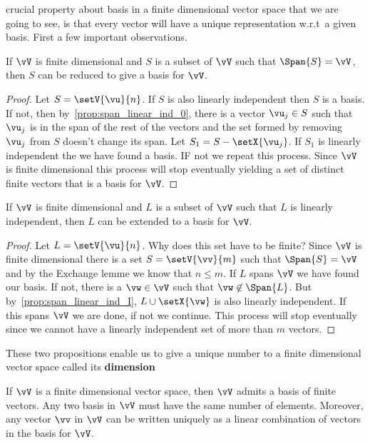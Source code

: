crucial property about basis in a finite dimensional vector space that we are going to see, is that every
vector will have a unique representation w.r.t~a given basis. 
First a few important observations.
\begin{Proposition}
    If $\vV$ is finite dimensional and $S$ is a subset of $\vV$ such that $\Span{S} = \vV$, then $S$ can be
    reduced to give a basis for $\vV$.
\end{Proposition}
\begin{proof}
    Let $S = \setV{\vu}{n}$. If $S$ is also linearly independent then $S$ is a basis. If not, then 
    by~\ref{prop:span_linear_ind_0}, there is a vector $\vu_j \in S$ such that $\vu_j$ is in the span of the
    rest of the vectors and the set formed by removing $\vu_j$ from $S$ doesn't change its span.  
    Let $S_1 = S - \setX{\vu_j}$. If $S_1$ is linearly independent the we have found a basis. IF not we repeat
    this process. Since $\vV$ is finite dimensional this process will stop eventually yielding a set of
    distinct finite vectors that is a basis for $\vV$.
\end{proof}
\begin{Proposition}
    If $\vV$ is finite dimensional and $L$ is a subset of $\vV$ such that $L$ is linearly independent, then
    $L$ can be extended to a basis for $\vV$.
\end{Proposition}
\begin{proof}
    Let $L = \setV{\vu}{n}$. Why does this set have to be finite? Since $\vV$ is finite dimensional there is a
    set $S = \setV{\vv}{m}$ such that $\Span{S} = \vV$ and by the Exchange lemme we know that $n \leq m$.
    If $L$ spans $\vV$ we have found our basis. If not, there is a $\vw \in \vV$ such that $\vw \not\in
    \Span{L}$. But by~\ref{prop:span_linear_ind_I}, $L\cup\setX{\vw}$ is also linearly independent. If this
    spans $\vV$ we are done, if not we continue. This process will stop eventually since we cannot have a
    linearly independent set of more than $m$ vectors.
\end{proof}
These two propositions enable us to give a unique number to a finite dimensional vector space called its
\textbf{dimension}
\begin{Proposition}
    If $\vV$ is a finite dimensional vector space, then $\vV$ admits a basis of finite vectors. Any two basis
    in $\vV$ must have the same number of elements. Moreover, any vector $\vv$ in $\vV$ can be written
    uniquely as a linear combination of vectors in the basis for $\vV$. 
\end{Proposition}
